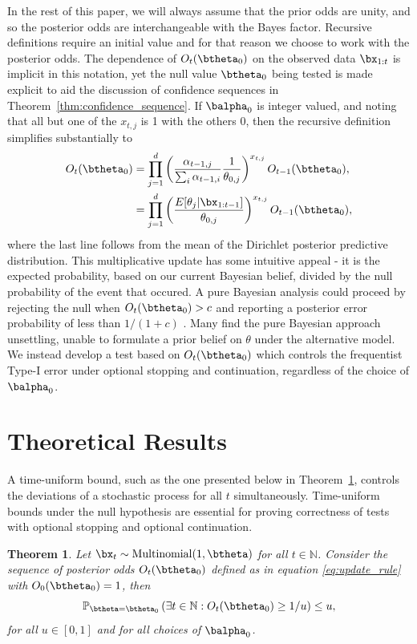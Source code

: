 \documentclass[11pt]{article}
\newtheorem{thm}{Theorem}[section]
\begin{document}
In the rest of this paper, we will always assume that the prior odds are unity, and so the posterior odds are interchangeable with the Bayes factor.
Recursive definitions require an initial value and for that reason we choose to work with the posterior odds.
The dependence of $O_t(\btheta_0)$ on the observed data $\bx_{1:t}$ is implicit in this notation, yet the null value $\btheta_0$ being tested is made explicit to aid the discussion of confidence sequences in Theorem~\ref{thm:confidence_sequence}.
If $\balpha_0$ is integer valued, and noting that all but one of the $x_{t,j}$ is 1 with the others 0, then the recursive definition simplifies substantially to
\begin{align}
  \label{eq:simplified_bayes_factor}
  O_{t}(\btheta_0) &= \prod_{j=1}^{d} \left(\frac{\alpha_{t-1,j}}{\sum_i \alpha_{t-1,i}} \frac{1}{\theta_{0,j}}\right)^{x_{t,j}} O_{t-1}(\btheta_0),\\
  &=\prod_{j=1}^{d}\left(\frac{E[\theta_j|\bx_{1:t-1}]}{\theta_{0,j}} \right)^{x_{t,j}} O_{t-1}(\btheta_0),
\end{align}
where the last line follows from the mean of the Dirichlet posterior predictive distribution.
This multiplicative update has some intuitive appeal - it is the expected probability, based on our current Bayesian belief, divided by the null probability of the event that occured.
A pure Bayesian analysis could proceed by rejecting the null when $O_t(\btheta_0) > c$ and reporting a posterior error probability of less than $1/(1+c)$ \citep[Chapter 5]{bernardo}.
Many find the pure Bayesian approach unsettling, unable to formulate a prior belief on $\theta$ under the alternative model.
We instead develop a test based on $O_t(\btheta_0)$ which controls the frequentist Type-I error under optional stopping and continuation, regardless of the choice of $\balpha_0$.

\section{Theoretical Results}
\label{sec:theory}
A time-uniform bound, such as the one presented below in Theorem~\ref{thm:type_1_error}, controls the deviations of a stochastic process for all $t$ simultaneously.
Time-uniform bounds under the null hypothesis are essential for proving correctness of tests with optional stopping and optional continuation.
\begin{thm}  
  \label{thm:type_1_error}
  Let $\bx_t\sim \mathrm{Multinomial}(1,\btheta)$ for all $t \in \mathbb{N}$.
Consider the sequence of posterior odds $O_t(\btheta_0)$ defined as in equation \eqref{eq:update_rule} with $O_0(\btheta_0)=1$, then
\begin{equation}
  \label{eq:type_1_error}
  \mathbb{P}_{\btheta = \btheta_0}\left( \exists t \in \mathbb{N}: O_t(\btheta_0) \geq 1/u \right) \leq u,
\end{equation}
for all $u \in [0,1]$ and for all choices of $\balpha_0$.
\end{thm}
\end{document}
